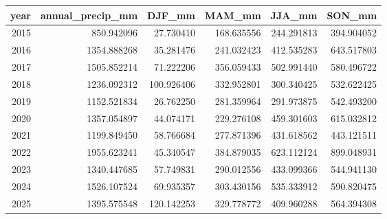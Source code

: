 \begin{tabular}{rrrrrr}
\toprule
year & annual\_precip\_mm & DJF\_mm & MAM\_mm & JJA\_mm & SON\_mm \\
\midrule
2015 & 850.942096 & 27.730410 & 168.635556 & 244.291813 & 394.904052 \\
2016 & 1354.888268 & 35.281476 & 241.032423 & 412.535283 & 643.517803 \\
2017 & 1505.852214 & 71.222206 & 356.059433 & 502.991440 & 580.496722 \\
2018 & 1236.092312 & 100.926406 & 332.952801 & 300.340425 & 532.622425 \\
2019 & 1152.521834 & 26.762250 & 281.359964 & 291.973875 & 542.493200 \\
2020 & 1357.054897 & 44.074171 & 229.276108 & 459.301603 & 615.032812 \\
2021 & 1199.849450 & 58.766684 & 277.871396 & 431.618562 & 443.121511 \\
2022 & 1955.623241 & 45.340547 & 384.879035 & 623.112124 & 899.048931 \\
2023 & 1340.447685 & 57.749831 & 290.012556 & 433.099366 & 544.941130 \\
2024 & 1526.107524 & 69.935357 & 303.430156 & 535.333912 & 590.820475 \\
2025 & 1395.575548 & 120.142253 & 329.778772 & 409.960288 & 564.394308 \\
\bottomrule
\end{tabular}
